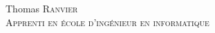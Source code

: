 \parbox[top][0.09\textheight][c]{\linewidth}{
	\centering
    {\sffamily\Huge Thomas \textsc{Ranvier}}\\\medskip
    {\LARGE\color{headings}\textsc{Apprenti en \'ecole d'ing\'enieur en informatique}}
}
